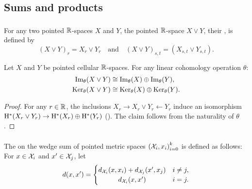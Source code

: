 
\subsection{Sums and products}

\subsubsection{}

For any two pointed $\mathbb{R}$-spaces $X$ and $Y$, the pointed $\mathbb{R}$-space $X \vee Y$, their , is defined by
\[
(X \vee Y)_r = X_r \vee Y_r \quad\text{and}\quad (X \vee Y)_{s,t} = (X_{s,t} \vee Y_{s,t}).
\]

\medskip\theorem
Let $X$ and $Y$ be pointed cellular $\mathbb{R}$-spaces.
For any linear cohomology operation $\theta$:
\begin{align*}
	\operatorname{Im}_\theta(X \vee Y) &\cong \operatorname{Im}_\theta(X) \oplus \operatorname{Im}_\theta(Y), \\
	\operatorname{Ker}_\theta(X \vee Y) &\cong \operatorname{Ker}_\theta(X) \oplus \operatorname{Ker}_\theta(Y).
\end{align*}

\begin{proof}
	For any \(r \in \mathbb{R}\), the inclusions $X_r \to X_r \vee Y_r \leftarrow Y_r$ induce an isomorphism $\mathrm{H}^*(X_r \vee Y_r) \to \mathrm{H}^*(X_r) \oplus \mathrm{H}^*(Y_r)$ (\cite[Corollary 2.25.]{hatcher2000}).
	The claim follows from the naturality of \(\theta\).
\end{proof}

\subsubsection{}\label{ss:wedge sum}

The  on the wedge sum of pointed metric spaces ${(\mathcal{X}_i, x_i)}_{i = 0}^k$ is defined as follows: For $x \in \mathcal{X}_i$ and $x' \in \mathcal{X}_j$, let
\[
d(x, x') =
\begin{cases}
	d_{\cX_i}(x, x_i) + d_{\cX_j}(x', x_j) & i \neq j, \\
	\hfil d_{\cX_i}(x, x') & i = j.
\end{cases}
\]

